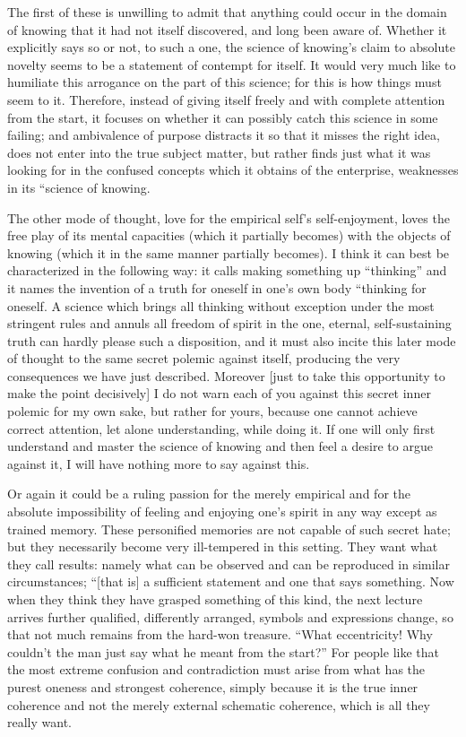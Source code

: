 The first of these is unwilling to admit
that anything could occur in the domain of knowing
that it had not itself discovered,
and long been aware of.
Whether it explicitly says so or not, to such a one,
the science of knowing's claim to absolute novelty
seems to be a statement of contempt for itself.
It would very much like to humiliate
this arrogance on the part of this science;
for this is how things must seem to it.
Therefore, instead of giving itself freely
and with complete attention from the start,
it focuses on whether it can possibly catch
this science in some failing;
and ambivalence of purpose distracts it
so that it misses the right idea,
does not enter into the true subject matter,
but rather finds just what it was looking for
in the confused concepts
which it obtains of the enterprise,
weaknesses in its “science of knowing.

The other mode of thought,
love for the empirical self's self-enjoyment,
loves the free play of its mental capacities
(which it partially becomes)
with the objects of knowing
(which it in the same manner partially becomes).
I think it can best be characterized in the following way:
it calls making something up “thinking”
and it names the invention of a truth
for oneself in one's own body
“thinking for oneself.
A science which brings all
thinking without exception
under the most stringent rules
and annuls all freedom of spirit
in the one, eternal, self-sustaining truth
can hardly please such a disposition,
and it must also incite this later
mode of thought to the same
secret polemic against itself,
producing the very consequences we have just described.
Moreover [just to take this opportunity
to make the point decisively]
I do not warn each of you against
this secret inner polemic for my own sake,
but rather for yours,
because one cannot achieve correct attention,
let alone understanding,
while doing it.
If one will only first understand
and master the science of knowing
and then feel a desire to argue against it,
I will have nothing more to say against this.

Or again it could be a ruling passion
for the merely empirical
and for the absolute impossibility of
feeling and enjoying one's spirit in any way
except as trained memory.
These personified memories are not capable of such secret hate;
but they necessarily become very ill-tempered in this setting.
They want what they call results:
namely what can be observed and
can be reproduced in similar circumstances;
“[that is] a sufficient statement and one that says something.
Now when they think they have grasped something of this kind,
the next lecture arrives further qualified,
differently arranged, symbols and expressions change,
so that not much remains from the hard-won treasure.
“What eccentricity! Why couldn't the man
just say what he meant from the start?”
For people like that the most extreme confusion and contradiction
must arise from what has the purest oneness and strongest coherence,
simply because it is the true inner coherence
and not the merely external schematic coherence,
which is all they really want.

